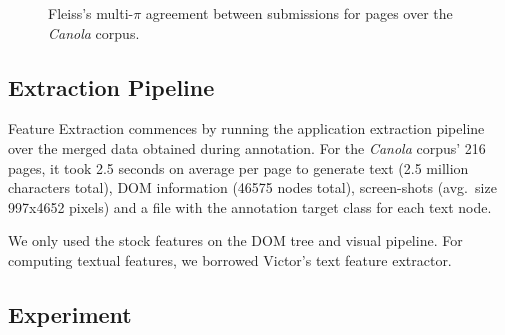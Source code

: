 \begin{figure}[h]
\centering
{}
\caption{
\label{f:merge}
\label{ens2}
	 Fleiss's multi-$\pi$ agreement \cite{artsteinpoesio2008} between submissions for pages over the \textit{Canola} corpus.}
\end{figure}


\subsection{Extraction Pipeline\label{extrapipe}}

Feature Extraction commences by running the {\KrdWrd} application extraction pipeline over the merged data obtained during annotation. 
For the \textit{Canola} corpus' 216 pages, it took 2.5 seconds on average per page to generate text (2.5 million characters total), DOM information (46575 nodes total), screen-shots (avg.~size 997x4652 pixels) and a file with the annotation target class for each text node.

We only used the stock {\KrdWrd} features on the DOM tree and visual pipeline.
For computing textual features, we borrowed Victor's \cite{spoustamarekpecina2008} text feature extractor.

\subsection{Experiment\label{experiment}}

